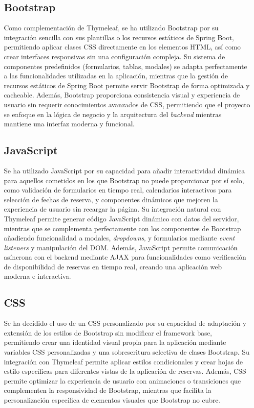 \subsection{Bootstrap}\label{bootstrap}
Como complementación de Thymeleaf, se ha utilizado Bootstrap por su integración sencilla con sus plantillas o los recursos estáticos de Spring Boot, permitiendo aplicar clases CSS directamente en los elementos HTML, así como crear interfaces responsivas sin una configuración compleja. Su sistema de componentes predefinidos (formularios, tablas, modales) se adapta perfectamente a las funcionalidades utilizadas en la aplicación, mientras que la gestión de recursos estáticos de Spring Boot permite servir Bootstrap de forma optimizada y cacheable. Además, Bootstrap proporciona consistencia visual y experiencia de usuario sin requerir conocimientos avanzados de CSS, permitiendo que el proyecto se enfoque en la lógica de negocio y la arquitectura del \emph{backend} mientras mantiene una interfaz moderna y funcional.

\subsection{JavaScript}\label{javascript}
Se ha utilizado JavaScript por su capacidad para añadir interactividad dinámica para aquellos cometidos en los que Bootstrap no puede proporcionar por sí solo, como validación de formularios en tiempo real, calendarios interactivos para selección de fechas de reserva, y componentes dinámicos que mejoren la experiencia de usuario sin recargar la página. Su integración natural con Thymeleaf permite generar código JavaScript dinámico con datos del servidor, mientras que se complementa perfectamente con los componentes de Bootstrap añadiendo funcionalidad a modales, \emph{dropdowns}, y formularios mediante \emph{event listeners} y manipulación del DOM. Además, JavaScript permite comunicación asíncrona con el backend mediante AJAX para funcionalidades como verificación de disponibilidad de reservas en tiempo real, creando una aplicación web moderna e interactiva.

\subsection{CSS}\label{css}
Se ha decidido el uso de un CSS personalizado por su capacidad de adaptación y extensión de los estilos de Bootstrap sin modificar el framework base, permitiendo crear una identidad visual propia para la aplicación mediante variables CSS personalizadas y una sobrescritura selectiva de clases Bootstrap. Su integración con Thymeleaf permite aplicar estilos condicionales y crear hojas de estilo específicas para diferentes vistas de la aplicación de reservas. Además, CSS permite optimizar la experiencia de usuario con animaciones o transiciones que complementen la responsividad de Bootstrap, mientras que facilita la personalización específica de elementos visuales que Bootstrap no cubre.

